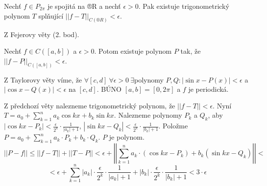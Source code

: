 \documentclass[12pt]{article}					%
\begin{document}

	\begin{veta}
		Nechť $f \in P_{2\pi}$ je spojitá na ®R a nechť $\epsilon > 0$. Pak existuje trigonometrický polynom $T$ splňující $||f - T||_{C(®R)} < \epsilon$.

		\begin{dukazin}
			Z Fejerovy věty (2. bod).
		\end{dukazin}
	\end{veta}

	\begin{dusledek}[Weierstrass]
		Nechť $f \in C([a, b])$ a $\epsilon > 0$. Potom existuje polynom $P$ tak, že $||f - P||_{C([a, b])} < \epsilon$.

		\begin{dukazin}
			Z Taylorovy věty víme, že $\forall [c, d]\ \forall \epsilon > 0\ \exists$polynomy $P, Q: |\sin x - P(x)| < \epsilon$ a $|\cos x - Q(x)| < \epsilon$ na $[c, d]$. BÚNO $[a, b] = [0, 2\pi]$ a $f$ je periodická.

			Z předchozí věty nalezneme trigonometrický polynom, že $||f - T|| < \epsilon$. Nyní $T = a_0 + \sum_{k=1}^n a_k \cos kx + b_k \sin k x$. Nalezneme polynomy $P_k$ a $Q_k$, aby $|\cos k x - P_k| < \frac{\epsilon}{2^k}·\frac{1}{|a_k| + 1}$, $|\sin k x - Q_k| < \frac{\epsilon}{2^k}·\frac{1}{|b_k| + 1}$. Položme $P = a_0 + \sum_{k=1}^n a_k·P_k + b_k·Q_k$. $P$ je polynom.
			$$ ||P - f|| ≤ ||f - T|| + ||T - P|| < \epsilon + \left|\left|\sum_{k=1}^n a_k·(\cos k x - P_k) + b_k(\sin k x - Q_k)\right|\right| < $$
			$$ < \epsilon + \sum_{k=1}^n |a_k|·\frac{\epsilon}{2^k}·\frac{1}{|a_k| + 1} + |b_k|·\frac{\epsilon}{2^k}·\frac{1}{|b_k| + 1} < 3·\epsilon $$
		\end{dukazin}
	\end{dusledek}
\end{document}
